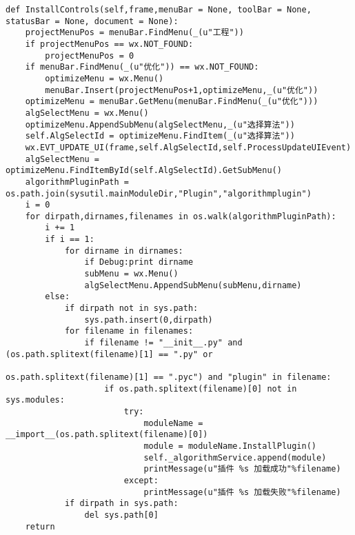\begin{lstlisting}
def InstallControls(self,frame,menuBar = None, toolBar = None, statusBar = None, document = None):
    projectMenuPos = menuBar.FindMenu(_(u"工程"))
    if projectMenuPos == wx.NOT_FOUND:
        projectMenuPos = 0
    if menuBar.FindMenu(_(u"优化")) == wx.NOT_FOUND:
        optimizeMenu = wx.Menu()
        menuBar.Insert(projectMenuPos+1,optimizeMenu,_(u"优化"))
    optimizeMenu = menuBar.GetMenu(menuBar.FindMenu(_(u"优化")))
    algSelectMenu = wx.Menu()
    optimizeMenu.AppendSubMenu(algSelectMenu,_(u"选择算法"))
    self.AlgSelectId = optimizeMenu.FindItem(_(u"选择算法"))
    wx.EVT_UPDATE_UI(frame,self.AlgSelectId,self.ProcessUpdateUIEvent)
    algSelectMenu = optimizeMenu.FindItemById(self.AlgSelectId).GetSubMenu()
    algorithmPluginPath = os.path.join(sysutil.mainModuleDir,"Plugin","algorithmplugin")
    i = 0
    for dirpath,dirnames,filenames in os.walk(algorithmPluginPath):
        i += 1
        if i == 1:
            for dirname in dirnames:
                if Debug:print dirname
                subMenu = wx.Menu()
                algSelectMenu.AppendSubMenu(subMenu,dirname)
        else:
            if dirpath not in sys.path:
                sys.path.insert(0,dirpath)
            for filename in filenames:
                if filename != "__init__.py" and (os.path.splitext(filename)[1] == ".py" or 
                                                    os.path.splitext(filename)[1] == ".pyc") and "plugin" in filename: 
                    if os.path.splitext(filename)[0] not in sys.modules:
                        try:
                            moduleName = __import__(os.path.splitext(filename)[0])
                            module = moduleName.InstallPlugin()
                            self._algorithmService.append(module)
                            printMessage(u"插件 %s 加载成功"%filename)
                        except:
                            printMessage(u"插件 %s 加载失败"%filename)
            if dirpath in sys.path:
                del sys.path[0]
    return
\end{lstlisting}

